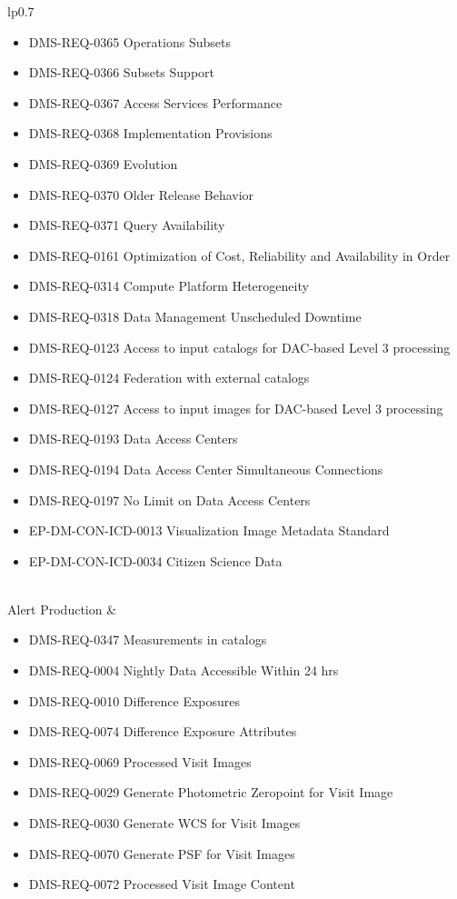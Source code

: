 \begin{xtabular}{lp{0.7\textwidth}}
\begin{itemize}
\item DMS-REQ-0365 Operations Subsets
\item DMS-REQ-0366 Subsets Support
\item DMS-REQ-0367 Access Services Performance
\item DMS-REQ-0368 Implementation Provisions
\item DMS-REQ-0369 Evolution
\item DMS-REQ-0370 Older Release Behavior
\item DMS-REQ-0371 Query Availability
\item DMS-REQ-0161 Optimization of Cost, Reliability and Availability in Order
\item DMS-REQ-0314 Compute Platform Heterogeneity
\item DMS-REQ-0318 Data Management Unscheduled Downtime
\item DMS-REQ-0123 Access to input catalogs for DAC-based Level 3 processing
\item DMS-REQ-0124 Federation with external catalogs
\item DMS-REQ-0127 Access to input images for DAC-based Level 3 processing
\item DMS-REQ-0193 Data Access Centers
\item DMS-REQ-0194 Data Access Center Simultaneous Connections
\item DMS-REQ-0197 No Limit on Data Access Centers
\item EP-DM-CON-ICD-0013 Visualization Image Metadata Standard
\item EP-DM-CON-ICD-0034 Citizen Science Data
\end{itemize} \\ \hline
Alert Production &
\begin{itemize}DMS-REQ-0333 Maximum Likelihood Values and Covariances
\item DMS-REQ-0347 Measurements in catalogs
\item DMS-REQ-0004 Nightly Data Accessible Within 24 hrs
\item DMS-REQ-0010 Difference Exposures
\item DMS-REQ-0074 Difference Exposure Attributes
\item DMS-REQ-0069 Processed Visit Images
\item DMS-REQ-0029 Generate Photometric Zeropoint for Visit Image
\item DMS-REQ-0030 Generate WCS for Visit Images
\item DMS-REQ-0070 Generate PSF for Visit Images
\item DMS-REQ-0072 Processed Visit Image Content

\end{itemize}
\end{xtabular}
